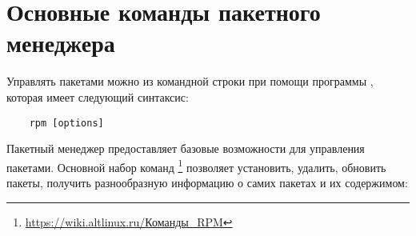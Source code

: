 \chapter{Основные команды пакетного менеджера}\label{basic-package-manager-commands}
Управлять пакетами можно из командной строки при помощи программы , которая имеет следующий синтаксис:
\begin{verbatim}
	rpm [options]
\end{verbatim}

Пакетный менеджер  предоставляет базовые возможности для управления пакетами. Основной набор команд%
\footnote{\href{https://wiki.altlinux.ru/\%D0\%9A\%D0\%BE\%D0\%BC\%D0\%B0\%D0\%BD\%D0\%B4\%D1\%8B_RPM}{https://wiki.altlinux.ru/Команды\_RPM}} 
позволяет установить, удалить, обновить пакеты, получить разнообразную информацию о самих пакетах и их содержимом:

